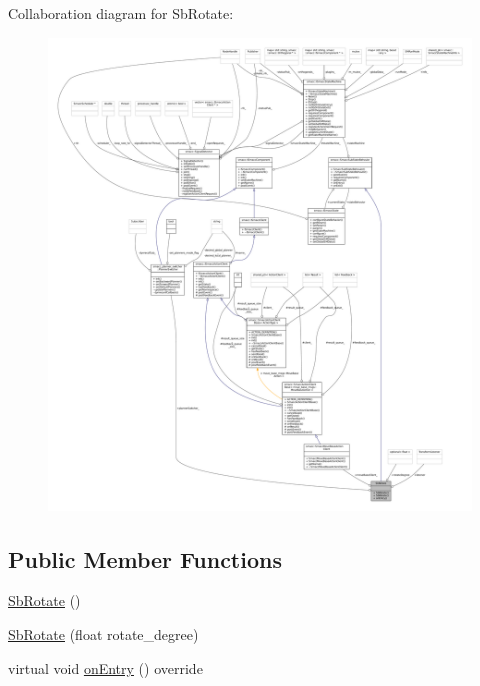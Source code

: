 Collaboration diagram for Sb\+Rotate\+:
\nopagebreak
\begin{figure}[H]
\begin{center}
\leavevmode
\includegraphics[width=350pt]{classSbRotate__coll__graph}
\end{center}
\end{figure}
\subsection*{Public Member Functions}
\begin{DoxyCompactItemize}
\item 
\hyperlink{classSbRotate_a63344fa43832836838bce4c3cab3b623}{Sb\+Rotate} ()
\item 
\hyperlink{classSbRotate_af1d6ccb865d08de3fc39100eb00bfced}{Sb\+Rotate} (float rotate\+\_\+degree)
\item 
virtual void \hyperlink{classSbRotate_adb33f70659313834da495c294e2eafeb}{on\+Entry} () override
\end{DoxyCompactItemize}
